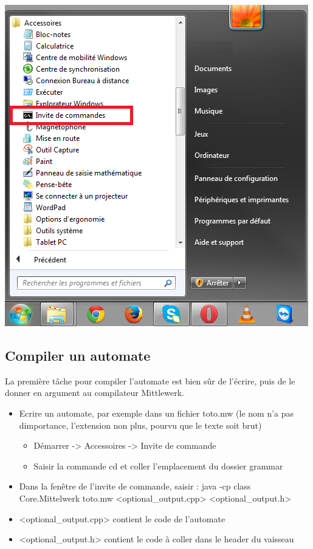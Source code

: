 \documentclass[a4paper,11pt]{article}
\begin{document}
\begin{center}
	\includegraphics[scale=0.75]{img/cmd.png}
\end{center}


\subsection{Compiler un automate}
La première tâche pour compiler l'automate est bien sûr de l'écrire, puis de le donner en argument au compilateur Mittlewerk.\newline

\begin{itemize}
	\item Ecrire un automate, par exemple dans un fichier toto.mw (le nom n'a pas dimportance, l'extension non plus, pourvu que le texte soit brut)
	\begin{itemize}
					\item Démarrer -> Accessoires -> Invite de commande
					\item Saisir la commande cd et coller l'emplacement du dossier grammar \newline
	\end{itemize}
	
	\item Dans la fenêtre de l'invite de commande, saisir : java -cp class Core.Mittelwerk toto.mw <optional\_output.cpp> <optional\_output.h>
	\item <optional\_output.cpp> contient le code de l'automate
	\item <optional\_output.h> contient le code à coller dans le header du vaisseau	
\end{itemize}
\end{document}
